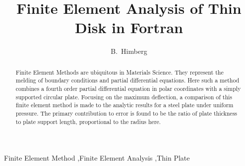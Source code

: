 \documentclass[12pt,times,twocolumn,3p]{elsarticle}
\begin{document}
\begin{frontmatter}



\title{Finite Element Analysis of Thin Disk in Fortran}


\author{B.~Himberg}

\address{}

\begin{abstract}
Finite Element Methods are ubiquitous in Materials Science. They represent the
melding of boundary conditions and partial differential equations. Here such a
method combines a fourth order partial differential equation in polar coordinates
with a simply supported circular plate. Focusing on the maximum deflection, a
comparison of this finite element method is made to the analytic results for
a steel plate under uniform pressure. The primary contribution to error is found
to be the ratio of plate thickness to plate support length, proportional to the
radius here.

\end{abstract}

\begin{keyword}
Finite Element Method \sep Finite Element Analysis \sep Thin Plate



\end{keyword}

\end{frontmatter}
\end{document}
